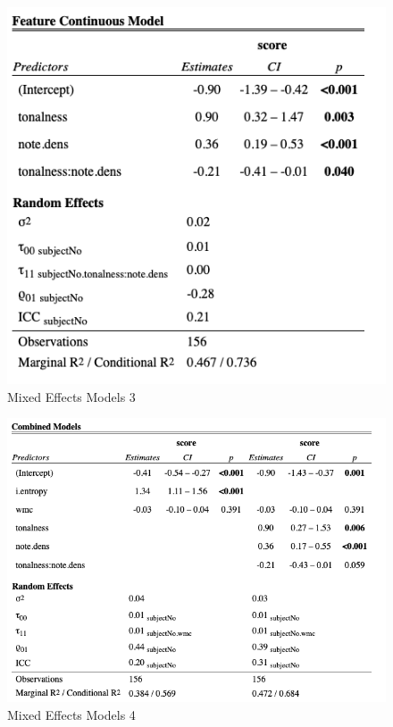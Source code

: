\documentclass[12pt,]{book}
\begin{document}
\begin{figure}

{\centering \includegraphics[width=1\linewidth]{img/metable3} 

}

\caption{Mixed Effects Models 3}\label{fig:metable3}
\end{figure}

\begin{figure}

{\centering \includegraphics[width=1\linewidth]{img/metable4} 

}

\caption{Mixed Effects Models 4}\label{fig:metable4}
\end{figure}
\end{document}
